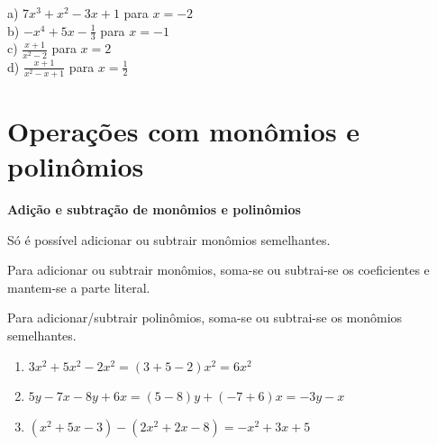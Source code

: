 \begin{exercicios}



\begin{multicols}{2}\large
a) $7x^3 + x^2 - 3x + 1$ para $x = -2$\\
b) $ - x^4 + 5x - \frac{1}{3}$ para $x = - 1$\\
c) $\frac{x+1}{x^2-2}$ para $x = 2$\\
d) $\frac{x+1}{x^2-x+1}$ para $x=\frac{1}{2}$
\end{multicols}\normalsize
\end{exercicios}

\section{Operações com monômios e polinômios}

\begin{caixa}

    \textbf{Adição e subtração de monômios e polinômios}
    
    \vspace{5mm}
    
    Só é possível adicionar ou subtrair monômios semelhantes.\\
    
    \vspace{5mm}
    
    Para adicionar ou subtrair monômios, soma-se ou subtrai-se os coeficientes e mantem-se a parte literal.\\
    
    \vspace{5mm}
    
    Para adicionar/subtrair polinômios, soma-se ou subtrai-se os monômios semelhantes.\\
    
\end{caixa}

\begin{texemplo}
\begin{enumerate}[label=(\alph*)]
    \item $3x^2 + 5x^2 - 2x^2 = (3+5-2)x^2 = 6x^2$
    \item $5y - 7x - 8y + 6x = (5-8)y + (-7+6)x = -3y - x$
    \item $(x^2 + 5x -3) - ( 2x^2 + 2x -8) = -x^2 + 3x + 5$
\end{enumerate}
\end{texemplo}

